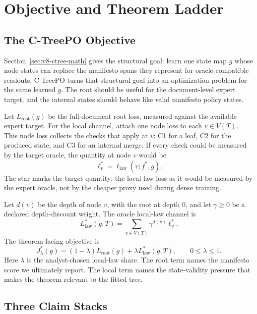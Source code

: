 \section{Objective and Theorem Ladder}
\label{sec:v8-objective}
\label{sec:v8-theorem-ladder}

\subsection{The C-TreePO Objective}

Section~\ref{sec:v8-ctree-math} gives the structural goal: learn one state map
\(g\) whose node states can replace the manifesto spans they represent for
oracle-compatible readouts. C-TreePO turns that structural goal into an
optimization problem for the same learned \(g\). The root should be useful for
the document-level expert target, and the internal states should behave like
valid manifesto policy states.

Let \(L_{\mathrm{root}}(g)\) be the full-document root loss, measured against
the available expert target. For the local channel, attach one node loss to
each \(v\in V(T)\). This node loss collects the checks that apply at \(v\):
C1 for a leaf, C2 for the produced state, and C3 for an internal merge. If
every check could be measured by the target oracle, the quantity at node \(v\)
would be
\[
  \ell_v^\ast
  =
  \ell_{\mathrm{law}}(v;f^\ast,g).
\]
The star marks the target quantity: the local-law loss as it would be measured
by the expert oracle, not by the cheaper proxy used during dense training.

Let \(d(v)\) be the depth of node \(v\), with the root at depth \(0\), and let
\(\gamma\ge 0\) be a declared depth-discount weight. The oracle local-law
channel is
\begin{equation}
\label{eq:v8-local-law-estimand}
  L_{\mathrm{law}}^\ast(g,T)
  =
  \sum_{v\in V(T)}\gamma^{d(v)}\ell_v^\ast .
\end{equation}
The theorem-facing objective is
\begin{equation}
\label{eq:v8-main-objective}
  J_\lambda^\ast(g)
  =
  (1-\lambda)L_{\mathrm{root}}(g)
  +
  \lambda L_{\mathrm{law}}^\ast(g,T),
  \qquad 0\le\lambda\le 1 .
\end{equation}
Here \(\lambda\) is the analyst-chosen local-law share. The root term names
the manifesto score we ultimately report. The local term names the
state-validity pressure that makes the theorem relevant to the fitted tree.

\subsection{Three Claim Stacks}

